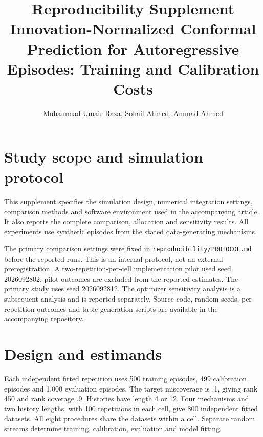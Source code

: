 \documentclass[10pt]{article}
\title{Reproducibility Supplement\\\large Innovation-Normalized Conformal Prediction for Autoregressive Episodes: Training and Calibration Costs}
\author{Muhammad Umair Raza, Sohail Ahmed, Ammad Ahmed}
\date{}
\begin{document}
\maketitle
\section{Study scope and simulation protocol}
This supplement specifies the simulation design, numerical integration settings, comparison methods and software environment used in the accompanying article. It also reports the complete comparison, allocation and sensitivity results. All experiments use synthetic episodes from the stated data-generating mechanisms.

The primary comparison settings were fixed in \texttt{reproducibility/PROTOCOL.md} before the reported runs. This is an internal protocol, not an external preregistration. A two-repetition-per-cell implementation pilot used seed 2026092802; pilot outcomes are excluded from the reported estimates. The primary study uses seed 2026092812. The optimizer sensitivity analysis is a subsequent analysis and is reported separately. Source code, random seeds, per-repetition outcomes and table-generation scripts are available in the accompanying repository.

\section{Design and estimands}
Each independent fitted repetition uses 500 training episodes, 499 calibration episodes and 1,000 evaluation episodes. The target miscoverage is .1, giving rank 450 and rank coverage .9. Histories have length 4 or 12. Four mechanisms and two history lengths, with 100 repetitions in each cell, give 800 independent fitted datasets. All eight procedures share the datasets within a cell. Separate random streams determine training, calibration, evaluation and model fitting.
\end{document}
